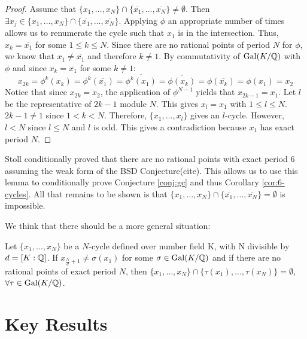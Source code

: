 \begin{proof}
	Assume that $\{x_1, \ldots, x_{N}\} \cap
	\{\overline{x_1}, \ldots, \overline{x_{N}}\} \neq \emptyset$.
	Then $\exists x_j \in \{x_1, \ldots, x_{N}\} \cap
	\{\overline{x_1}, \ldots, \overline{x_{N}}\}$. Applying $\phi$
	an appropriate number of times allows us to renumerate the cycle
	such that $x_1$ is in the intersection. Thus, $x_k = \overline{x_1}$
	for some $1 \leq k \leq N$. Since there are no rational points of
	period $N$ for $\phi$, we know that $x_1 \neq \overline{x_1}$ and
	therefore $k \neq 1$. By commutativity of $\mathrm{Gal}(K/\mathbb{Q})$ with $\phi$
	and since $x_k = \overline{x_1}$ for some $k \neq 1$:
	\[
		x_{2k} = \phi^k(x_k) = \phi^k(\overline{x_1}) = \overline{\phi^k(x_1)}
		= \overline{\phi(x_k)} = \phi(\overline{x_k}) = \phi(x_1) = x_2
	\]
	Notice that since $x_{2k} = x_2$, the application of $\phi^{N-1}$
	yields	that $x_{2k-1} = x_1$. Let $l$ be the representative of $2k-1$
	module $N$. This gives $x_l = x_1$ with $1 \leq l \leq N$. $2k-1 \neq 1$
	since $1 < k < N$. Therefore, $\{x_1, \ldots, x_l\}$ gives an $l$-cycle.
	However, $l < N$ since $l \leq N$ and $l$ is odd. This gives a
	contradiction because $x_1$ has exact period $N$.
\end{proof}

\begin{remark}[N = 6 case]
	Stoll conditionally proved that there are no rational points with exact
	period 6 assuming the weak form of the BSD Conjecture(cite). This allows
	us to use this lemma to conditionally prove Conjecture \ref{conj:gc} and thus
	Corollary \ref{cor:6-cycles}. All that remains to be shown is that
	$\{x_1, \ldots, x_{N}\} \cap \{\overline{x_1}, \ldots, \overline{x_{N}}\} =
	\emptyset$ is impossible.
\end{remark}

We think that there should be a more general situation:
\begin{conjecture}
	Let $\{x_1, \ldots, x_{N}\}$ be a $N$-cycle defined over number field K,
	with N divisible by	$d = [K:\mathbb{Q} ]$. If $x_{\frac{N}{d}+1} \neq \sigma(x_1)$
	for some $\sigma \in \mathrm{Gal}(K/\mathbb{Q})$ and if there are no rational points of
	exact period $N$, then $\{x_1, \ldots, x_{N}\} \cap \{\tau(x_1),
	\ldots, \tau(x_{N})\} = \emptyset$, $\forall \tau \in \mathrm{Gal}(K/\mathbb{Q})$.
\end{conjecture}

\section{Key Results}

